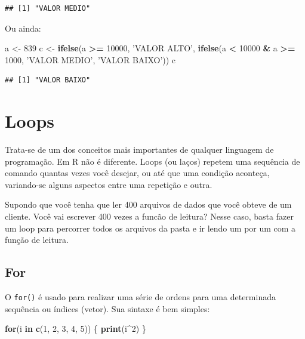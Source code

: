 \documentclass[]{book}
\newenvironment{Shaded}{\begin{snugshade}}{\end{snugshade}}
\newcommand{\KeywordTok}[1]{\textcolor[rgb]{0.13,0.29,0.53}{\textbf{#1}}}
\newcommand{\DecValTok}[1]{\textcolor[rgb]{0.00,0.00,0.81}{#1}}
\newcommand{\StringTok}[1]{\textcolor[rgb]{0.31,0.60,0.02}{#1}}
\newcommand{\ControlFlowTok}[1]{\textcolor[rgb]{0.13,0.29,0.53}{\textbf{#1}}}
\newcommand{\OperatorTok}[1]{\textcolor[rgb]{0.81,0.36,0.00}{\textbf{#1}}}
\newcommand{\NormalTok}[1]{#1}
\begin{document}
\begin{verbatim}
## [1] "VALOR MEDIO"
\end{verbatim}

Ou ainda:

\begin{Shaded}
\begin{Highlighting}[]
\NormalTok{a <-}\StringTok{ }\DecValTok{839}
\NormalTok{c <-}\StringTok{ }\KeywordTok{ifelse}\NormalTok{(a }\OperatorTok{>=}\StringTok{ }\DecValTok{10000}\NormalTok{, }\StringTok{'VALOR ALTO'}\NormalTok{, }\KeywordTok{ifelse}\NormalTok{(a }\OperatorTok{<}\StringTok{ }\DecValTok{10000} \OperatorTok{&}\StringTok{ }\NormalTok{a }\OperatorTok{>=}\StringTok{ }\DecValTok{1000}\NormalTok{, }\StringTok{'VALOR MEDIO'}\NormalTok{, }\StringTok{'VALOR BAIXO'}\NormalTok{))}
\NormalTok{c}
\end{Highlighting}
\end{Shaded}

\begin{verbatim}
## [1] "VALOR BAIXO"
\end{verbatim}

\section{Loops}\label{loops}

Trata-se de um dos conceitos mais importantes de qualquer linguagem de
programação. Em R não é diferente. Loops (ou laços) repetem uma
sequência de comando quantas vezes você desejar, ou até que uma condição
aconteça, variando-se alguns aspectos entre uma repetição e outra.

Supondo que você tenha que ler 400 arquivos de dados que você obteve de
um cliente. Você vai escrever 400 vezes a funcão de leitura? Nesse caso,
basta fazer um loop para percorrer todos os arquivos da pasta e ir lendo
um por um com a função de leitura.

\subsection{For}\label{for}

O \texttt{for()} é usado para realizar uma série de ordens para uma
determinada sequência ou índices (vetor). Sua sintaxe é bem simples:

\begin{Shaded}
\begin{Highlighting}[]
\ControlFlowTok{for}\NormalTok{(i }\ControlFlowTok{in} \KeywordTok{c}\NormalTok{(}\DecValTok{1}\NormalTok{, }\DecValTok{2}\NormalTok{, }\DecValTok{3}\NormalTok{, }\DecValTok{4}\NormalTok{, }\DecValTok{5}\NormalTok{)) \{}
  \KeywordTok{print}\NormalTok{(i}\OperatorTok{^}\DecValTok{2}\NormalTok{)}
\NormalTok{\}}
\end{Highlighting}
\end{Shaded}
\end{document}
